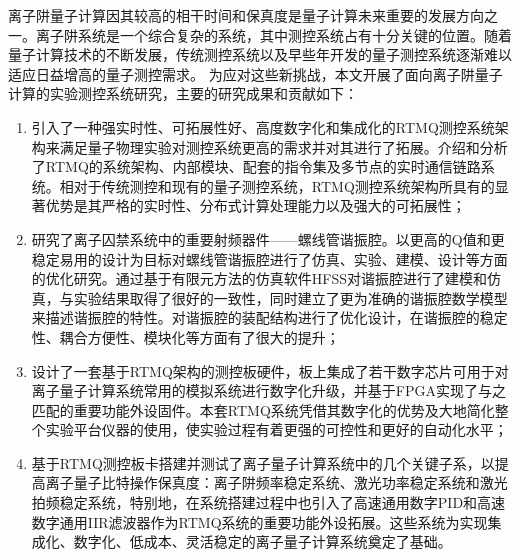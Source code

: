 
\begin{conclusion}

离子阱量子计算因其较高的相干时间和保真度是量子计算未来重要的发展方向之一。离子阱系统是一个综合复杂的系统，其中测控系统占有十分关键的位置。随着量子计算技术的不断发展，传统测控系统以及早些年开发的量子测控系统逐渐难以适应日益增高的量子测控需求。
为应对这些新挑战，本文开展了面向离子阱量子计算的实验测控系统研究，主要的研究成果和贡献如下：
\begin{enumerate}
    \item 引入了一种强实时性、可拓展性好、高度数字化和集成化的RTMQ测控系统架构来满足量子物理实验对测控系统更高的需求并对其进行了拓展。介绍和分析了RTMQ的系统架构、内部模块、配套的指令集及多节点的实时通信链路系统。相对于传统测控和现有的量子测控系统，RTMQ测控系统架构所具有的显著优势是其严格的实时性、分布式计算处理能力以及强大的可拓展性；
    \item 研究了离子囚禁系统中的重要射频器件——螺线管谐振腔。以更高的Q值和更稳定易用的设计为目标对螺线管谐振腔进行了仿真、实验、建模、设计等方面的优化研究。通过基于有限元方法的仿真软件HFSS对谐振腔进行了建模和仿真，与实验结果取得了很好的一致性，同时建立了更为准确的谐振腔数学模型来描述谐振腔的特性。对谐振腔的装配结构进行了优化设计，在谐振腔的稳定性、耦合方便性、模块化等方面有了很大的提升；
    \item 设计了一套基于RTMQ架构的测控板硬件，板上集成了若干数字芯片可用于对离子量子计算系统常用的模拟系统进行数字化升级，并基于FPGA实现了与之匹配的重要功能外设固件。本套RTMQ系统凭借其数字化的优势及大地简化整个实验平台仪器的使用，使实验过程有着更强的可控性和更好的自动化水平；
    \item 基于RTMQ测控板卡搭建并测试了离子量子计算系统中的几个关键子系，以提高离子量子比特操作保真度：离子阱频率稳定系统、激光功率稳定系统和激光拍频稳定系统，特别地，在系统搭建过程中也引入了高速通用数字PID和高速数字通用IIR滤波器作为RTMQ系统的重要功能外设拓展。这些系统为实现集成化、数字化、低成本、灵活稳定的离子量子计算系统奠定了基础。
\end{enumerate}



\end{conclusion}
